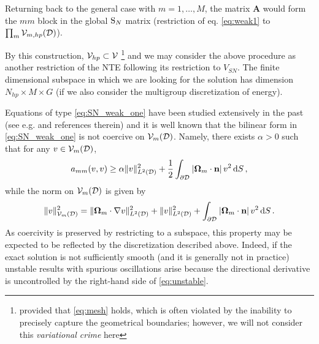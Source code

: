 \noindent Returning back to the general case with $m = 1,\ldots,M$, the matrix $\mathbf{A}$
would form the $mm$ block in the global $\SN$ matrix (restriction of eq. \eqref{eq:weak1} to $\prod_{m} \Space_{m,hp}(\VV)$).  

By this construction, $\Space_{hp} \subset \Space$ \footnote{provided that \eqref{eq:mesh} holds, which is often
violated by the inability to precisely capture the geometrical boundaries; however, we will not consider this
\textit{variational crime} here} and we may consider the above procedure as another restriction of the NTE following its restriction to $V_{SN}$.
The finite dimensional subspace in which we are looking for the solution has dimension $N_{hp} \times M \times G$ (if we also consider the multigroup discretization of energy).

Equations of type \eqref{eq:SN_weak_one} have been studied extensively in the past (see e.g. \cite{hartmann} and
references therein) and it is well known that the bilinear form in \eqref{eq:SN_weak_one} is not coercive on
$\Space_m(\VV)$. Namely, there exists $\alpha > 0$ such that for any $v \in \Space_m(\VV)$,
\begin{equation}\label{eq:unstable}
	a_{mm}(v,v) \geq \alpha \norm[{\Lp[2](\VV)}]{v}^2 + \frac{1}{2}\int_{\pV} \abs{\bomega_m\cdot\bn} v^2 \,\d{S},
\end{equation}
while the norm on $\Space_m(\VV)$ is given by
$$
	\norm[{\Space_m(\VV)}]{v}^2 = \norm[{\Lp[2](\VV)}]{\bomega_m\cdot\nabla v}^2 + \norm[{\Lp[2](\VV)}]{v}^2 +
	\int_{\pV} \abs{\bomega_m\cdot\bn} v^2 \,\d{S}. 
$$
As coercivity is preserved by restricting to a subspace, this property may be expected to be reflected by the
discretization described above. Indeed, if the exact solution is not sufficiently smooth (and it is generally not in
practice) unstable results with spurious oscillations arise because the directional derivative is uncontrolled by the
right-hand side of \eqref{eq:unstable}.

